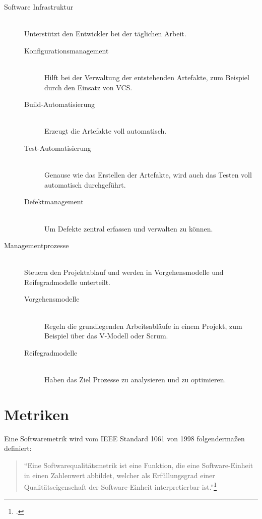 \begin{description}
  \item[Software Infrastruktur] \hfill \\ Unterstützt den Entwickler bei der täglichen Arbeit.
  \begin{description}
    \item[Konfigurationsmanagement] \hfill \\ Hilft bei der Verwaltung der entstehenden Artefakte, zum Beispiel durch den Einsatz von \ac{VCS}.
    \item[Build-Automatisierung] \hfill \\ Erzeugt die Artefakte voll automatisch.
    \item[Test-Automatisierung] \hfill \\ Genause wie das Erstellen der Artefakte, wird auch das Testen voll automatisch durchgeführt.
    \item[Defektmanagement] \hfill \\ Um Defekte zentral erfassen und verwalten zu können.
  \end{description}
  \item[Managementprozesse] \hfill \\ Steuern den Projektablauf und werden in Vorgehensmodelle und Reifegradmodelle unterteilt.
  \begin{description}
    \item[Vorgehensmodelle] \hfill \\ Regeln die grundlegenden Arbeitsabläufe in einem Projekt, zum Beispiel über das V-Modell oder Scrum.
    \item[Reifegradmodelle] \hfill \\ Haben das Ziel Prozesse zu analysieren und zu optimieren.
  \end{description}
\end{description}

\clearpage
\section{Metriken}

Eine Softwaremetrik wird vom \ac{IEEE} Standard 1061 von 1998 folgendermaßen definiert:
\begin{quote}
  ``Eine Softwarequalitätsmetrik ist eine Funktion, die eine Software-Einheit in einen Zahlenwert abbildet, welcher als Erfüllungsgrad einer Qualitätseigenschaft der Software-Einheit interpretierbar ist.''\footcite[vgl.][S.3]{ieee-1061}
\end{quote}

